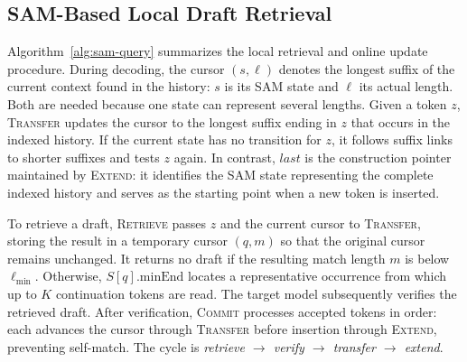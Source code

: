 \documentclass[letterpaper]{article} %
\begin{document}
\subsection{SAM-Based Local Draft Retrieval}

Algorithm~\ref{alg:sam-query} summarizes the local retrieval and online update procedure. During decoding, the cursor $(s,\ell)$ denotes the longest suffix of the current context found in the history: $s$ is its SAM state and $\ell$ its actual length. Both are needed because one state can represent several lengths. Given a token $z$, \textsc{Transfer} updates the cursor to the longest suffix ending in $z$ that occurs in the indexed history. If the current state has no transition for $z$, it follows suffix links to shorter suffixes and tests $z$ again. In contrast, $last$ is the construction pointer maintained by \textsc{Extend}: it identifies the SAM state representing the complete indexed history and serves as the starting point when a new token is inserted.

To retrieve a draft, \textsc{Retrieve} passes $z$ and the current cursor to \textsc{Transfer}, storing the result in a temporary cursor $(q,m)$ so that the original cursor remains unchanged. It returns no draft if the resulting match length $m$ is below $\ell_{\min}$. Otherwise, $S[q].\mathrm{minEnd}$ locates a representative occurrence from which up to $K$ continuation tokens are read. The target model subsequently verifies the retrieved draft. After verification, \textsc{Commit} processes accepted tokens in order: each advances the cursor through \textsc{Transfer} before insertion through \textsc{Extend}, preventing self-match. The cycle is \emph{retrieve $\rightarrow$ verify $\rightarrow$ transfer $\rightarrow$ extend}.
\end{document}
